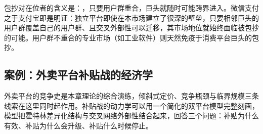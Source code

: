 包抄对在位者的含义是：，只要用户群重合，巨头就随时可能跨界进入。微信支付之于支付宝即是明证：独立平台即使在本市场建立了很深的壁垒，只要相邻巨头的用户群覆盖自己的用户群、且交叉外部性可以迁移，其市场地位就始终面临被包抄的可能。用户群不重合的专业市场（如工业软件）则天然免疫于消费平台巨头的包抄。

\subsection{案例：外卖平台补贴战的经济学}

外卖平台的竞争史是本章理论的综合演练，倾斜式定价、竞争瓶颈与临界规模三条线索在这里同时起作用。补贴战的动力学可以用一个简化的双平台模型完整刻画，模型把霍特林差异化结构与交叉网络外部性结合起来，回答三个问题：补贴为什么有效、补贴为什么会升级、补贴什么时候停止。

